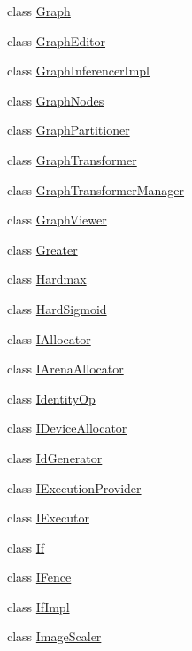 \begin{DoxyCompactItemize}
class \mbox{\hyperlink{classonnxruntime_1_1Graph}{Graph}}
\item 
class \mbox{\hyperlink{classonnxruntime_1_1GraphEditor}{Graph\+Editor}}
\item 
class \mbox{\hyperlink{classonnxruntime_1_1GraphInferencerImpl}{Graph\+Inferencer\+Impl}}
\item 
class \mbox{\hyperlink{classonnxruntime_1_1GraphNodes}{Graph\+Nodes}}
\item 
class \mbox{\hyperlink{classonnxruntime_1_1GraphPartitioner}{Graph\+Partitioner}}
\item 
class \mbox{\hyperlink{classonnxruntime_1_1GraphTransformer}{Graph\+Transformer}}
\item 
class \mbox{\hyperlink{classonnxruntime_1_1GraphTransformerManager}{Graph\+Transformer\+Manager}}
\item 
class \mbox{\hyperlink{classonnxruntime_1_1GraphViewer}{Graph\+Viewer}}
\item 
class \mbox{\hyperlink{classonnxruntime_1_1Greater}{Greater}}
\item 
class \mbox{\hyperlink{classonnxruntime_1_1Hardmax}{Hardmax}}
\item 
class \mbox{\hyperlink{classonnxruntime_1_1HardSigmoid}{Hard\+Sigmoid}}
\item 
class \mbox{\hyperlink{classonnxruntime_1_1IAllocator}{I\+Allocator}}
\item 
class \mbox{\hyperlink{classonnxruntime_1_1IArenaAllocator}{I\+Arena\+Allocator}}
\item 
class \mbox{\hyperlink{classonnxruntime_1_1IdentityOp}{Identity\+Op}}
\item 
class \mbox{\hyperlink{classonnxruntime_1_1IDeviceAllocator}{I\+Device\+Allocator}}
\item 
class \mbox{\hyperlink{classonnxruntime_1_1IdGenerator}{Id\+Generator}}
\item 
class \mbox{\hyperlink{classonnxruntime_1_1IExecutionProvider}{I\+Execution\+Provider}}
\item 
class \mbox{\hyperlink{classonnxruntime_1_1IExecutor}{I\+Executor}}
\item 
class \mbox{\hyperlink{classonnxruntime_1_1If}{If}}
\item 
class \mbox{\hyperlink{classonnxruntime_1_1IFence}{I\+Fence}}
\item 
class \mbox{\hyperlink{classonnxruntime_1_1IfImpl}{If\+Impl}}
\item 
class \mbox{\hyperlink{classonnxruntime_1_1ImageScaler}{Image\+Scaler}}
\item 

\end{DoxyCompactItemize}
